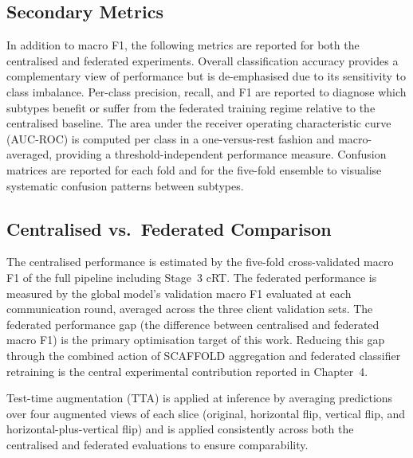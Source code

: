 \subsection{Secondary Metrics}
\label{sec:secondary-metrics}

In addition to macro F1, the following metrics are reported
for both the centralised and federated experiments.
Overall classification accuracy provides a complementary
view of performance but is de-emphasised due to its
sensitivity to class imbalance.
Per-class precision, recall, and F1 are reported to diagnose
which subtypes benefit or suffer from the federated training
regime relative to the centralised baseline.
The area under the receiver operating characteristic curve
(AUC-ROC) is computed per class in a one-versus-rest fashion
and macro-averaged, providing a threshold-independent
performance measure.
Confusion matrices are reported for each fold and for the
five-fold ensemble to visualise systematic confusion patterns
between subtypes.


\subsection{Centralised vs.\ Federated Comparison}
\label{sec:fed-vs-central}

The centralised performance is estimated by the five-fold
cross-validated macro F1 of the full pipeline including
Stage~3 cRT.
The federated performance is measured by the global model's
validation macro F1 evaluated at each communication round,
averaged across the three client validation sets.
The federated performance gap (the difference between
centralised and federated macro F1) is the primary
optimisation target of this work.
Reducing this gap through the combined action of SCAFFOLD
aggregation and federated classifier retraining is the
central experimental contribution reported in Chapter~4.

Test-time augmentation (TTA) is applied at inference by
averaging predictions over four augmented views of each
slice (original, horizontal flip, vertical flip, and
horizontal-plus-vertical flip) and is applied consistently
across both the centralised and federated evaluations
to ensure comparability.


